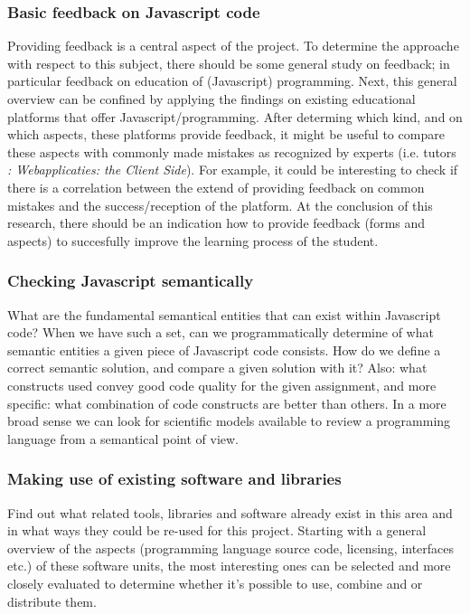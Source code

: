 \documentclass{article}
\begin{document}
\subsubsection{Basic feedback on Javascript code
} Providing feedback is a central aspect of the project. To determine the 
approache with respect to this subject, there should be some general study on 
feedback; in particular feedback on education of (Javascript) programming. Next, 
this general overview can be confined by applying the findings on existing 
educational platforms that offer Javascript/programming. After determing which 
kind, and on which aspects, these platforms provide feedback, it might be useful 
to compare these aspects with commonly made mistakes as recognized by experts 
(i.e. tutors {\em: Webapplicaties: the Client Side}). For example, it could be 
interesting to check if there is a correlation between the extend of providing 
feedback on common mistakes and the success/reception of the platform. At the 
conclusion of this research, there should be an indication how to provide 
feedback (forms and aspects) to succesfully improve the learning process of the 
student. 

\subsubsection{Checking Javascript semantically}
What are the fundamental semantical entities that can exist within Javascript
code? When we have such a set, can we programmatically determine of what
semantic entities a given piece of Javascript code consists. How do we define a
correct semantic solution, and compare a given solution with it? Also: what
constructs used convey good code quality for the given assignment, and more
specific: what combination of code constructs are better than others. In a
more broad sense we can look for scientific models available to review a
programming language from a semantical point of view. 

\subsubsection{Making use of existing software and libraries}
Find out what related tools, libraries and software already exist in this area
and in what ways they could be re-used for this project. Starting with a
general overview of the aspects (programming language source code, licensing,
interfaces etc.) of these software units, the most interesting ones can be
selected and more closely evaluated to determine whether it's possible to use,
combine and or distribute them.
\end{document}
